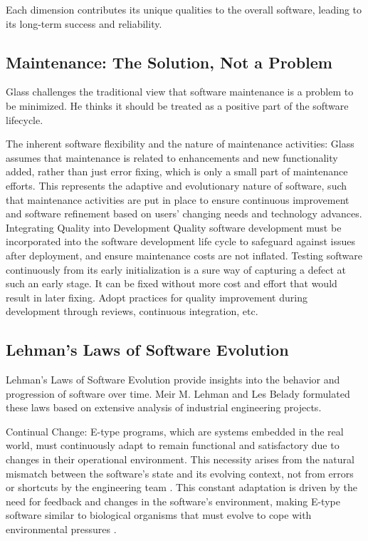 Each dimension contributes its unique qualities to the overall software, leading to its long-term success and reliability.

\subsection{Maintenance: The Solution, Not a Problem}

Glass challenges the traditional view that software maintenance is a problem to be minimized. He thinks it should be treated as a positive part of the software lifecycle.

The inherent software flexibility and the nature of maintenance activities: Glass assumes that maintenance is related to enhancements and new functionality added, rather than just error fixing, which is only a small part of maintenance efforts. This represents the adaptive and evolutionary nature of software, such that maintenance activities are put in place to ensure continuous improvement and software refinement based on users' changing needs and technology advances. Integrating Quality into Development Quality software development must be incorporated into the software development life cycle to safeguard against issues after deployment, and ensure maintenance costs are not inflated. Testing software continuously from its early initialization is a sure way of capturing a defect at such an early stage. It can be fixed without more cost and effort that would result in later fixing. Adopt practices for quality improvement during development through reviews, continuous integration, etc.



\cite{ManagingMaintenance1983}
 \cite{MaintenanceGlass1998}
    \cite{lientz1980software}
    \cite{MetricsMaintainability1994}
    \cite{osterweil1996strategic}

    
\subsection{Lehman’s Laws of Software Evolution}

Lehman’s Laws of Software Evolution provide insights into the behavior and progression of software over time. Meir M. Lehman and Les Belady formulated these laws based on extensive analysis of industrial engineering projects.

Continual Change: E-type programs, which are systems embedded in the real world, must continuously adapt to remain functional and satisfactory due to changes in their operational environment. This necessity arises from the natural mismatch between the software's state and its evolving context, not from errors or shortcuts by the engineering team \cite{Lehman1996Laws}. This constant adaptation is driven by the need for feedback and changes in the software's environment, making E-type software similar to biological organisms that must evolve to cope with environmental pressures \cite{LehmanLaws1980}.

